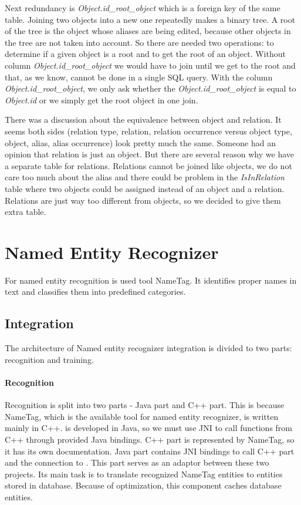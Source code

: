 Next redundancy is \emph{Object.id\_{}root\_{}object} which is a foreign key of
the same table. Joining two objects into a new one repeatedly
makes a binary tree. A root of the tree is the object whose aliases are being
edited, because other objects in the tree are not taken into account. So there are needed two operations: to determine if a given object is a root and to get the
root of an object. Without column \emph{Object.id\_{}root\_{}object} we would have to
join until we get to the root and that, as we know, cannot be done in a single
SQL query. With the column \emph{Object.id\_{}root\_{}object}, we only ask whether the \emph{Object.id\_{}root\_{}object} is equal to \emph{Object.id} or we simply get the root object in one join.

There was a discussion about the equivalence between object and relation. It
seems both sides (relation type, relation, relation occurrence versus object type,
object, alias, alias occurrence) look pretty much the same. Someone had an
opinion that relation is just an object. But there are several reason why we
have a separate table for relations. Relations cannot be joined like objects, we
do not care too much about the alias and there could be problem in the 
\emph{IsInRelation} table where two objects could be assigned instead of an
object and a relation. Relations are just way too different from objects, so we
decided to give them extra table.

\section{Named Entity Recognizer}
\label{sec:NamedEntityRecognizer}
For named entity recognition is used tool NameTag. It identifies proper names in text and classifies them into predefined categories.

\subsection{Integration}
The architecture of Named entity recognizer integration is divided to two parts: recognition
and training.

\paragraph{Recognition} 
Recognition is split into two parts - Java part and C++ part. This is because
NameTag, which is the available tool for named entity recognizer, is written
mainly in C++. \textan{} is developed in Java, so we must use JNI to call
functions from C++ through provided Java bindings. C++ part is represented by
NameTag, so it has its own documentation. Java part contains JNI bindings to
call C++ part and the connection to \textan{}. This part serves as an adaptor
between these two projects. Its main task is to translate recognized NameTag
entities to entities stored in \textan{} database. Because of optimization, this
component caches database entities.

